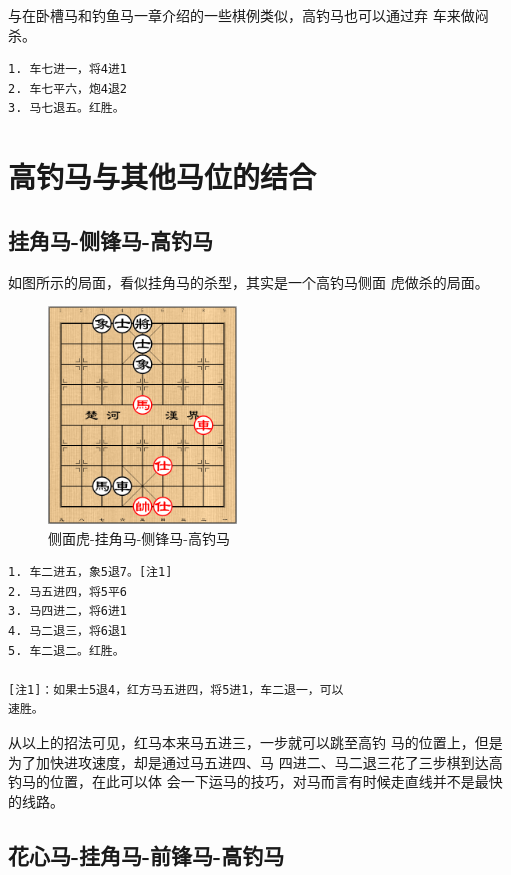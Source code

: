 \documentclass[a5paper,twoside]{book}
\begin{document}
与在卧槽马和钓鱼马一章介绍的一些棋例类似，高钓马也可以通过弃
车来做闷杀。

\begin{verbatim}
1. 车七进一，将4进1
2. 车七平六，炮4退2
3. 马七退五。红胜。
\end{verbatim}

\section{高钓马与其他马位的结合}
\label{sec-4-5}
\subsection{挂角马-侧锋马-高钓马}
\label{sec-4-5-1}
如图所示的局面，看似挂角马的杀型，其实是一个高钓马侧面
虎做杀的局面。

\begin{figure}[H]
\centering
\includegraphics[width=5cm]{pic/侧面虎-挂角马-侧锋马-高钓马.png}
\caption{侧面虎-挂角马-侧锋马-高钓马}
\end{figure}


\begin{verbatim}
1. 车二进五，象5退7。[注1]
2. 马五进四，将5平6
3. 马四进二，将6进1
4. 马二退三，将6退1
5. 车二退二。红胜。   
   
[注1]：如果士5退4，红方马五进四，将5进1，车二退一，可以
速胜。
\end{verbatim}

从以上的招法可见，红马本来马五进三，一步就可以跳至高钓
马的位置上，但是为了加快进攻速度，却是通过马五进四、马
四进二、马二退三花了三步棋到达高钓马的位置，在此可以体
会一下运马的技巧，对马而言有时候走直线并不是最快的线路。

\subsection{花心马-挂角马-前锋马-高钓马}
\label{sec-4-5-2}
\end{document}
